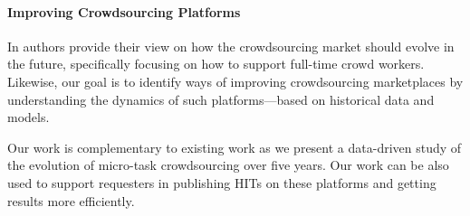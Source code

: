 \paragraph{Improving Crowdsourcing Platforms}
In \cite{Kittur:2013:FCW:2441776.2441923} authors provide their view on how the crowdsourcing market should evolve in the future, specifically focusing on how to support full-time crowd workers. 
Likewise, our goal is to identify ways of improving crowdsourcing marketplaces by understanding the dynamics of such platforms---based on historical data and models.

Our work is complementary to existing work as we present a data-driven study of the evolution of micro-task crowdsourcing over five years.
Our work can be also used to support requesters in publishing HITs on these platforms and getting results more efficiently.




